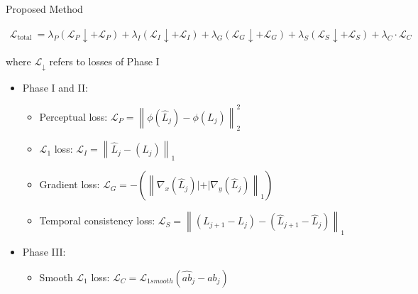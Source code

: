 \documentclass[aspectratio=43]{beamer}
\begin{document}
\begin{frame}{Proposed Method}
{\begin{footnotesize}
				\begin{equation*}
					\begin{gathered}
						\mathcal{L}_{\text {total }}=\lambda_{P}\left(\mathcal{L}_{P} \downarrow+\mathcal{L}_{P}\right)+\lambda_{I}\left(\mathcal{L}_{I} \downarrow+\mathcal{L}_{I}\right)+ 
						\lambda_{G}\left(\mathcal{L}_{G} \downarrow+\mathcal{L}_{G}\right)+\lambda_{S}\left(\mathcal{L}_{S} \downarrow+\mathcal{L}_{S}\right)+\lambda_{C} \cdot \mathcal{L}_{C}
					\end{gathered}
				\end{equation*}
			\end{footnotesize}
			where $ \mathcal{L}_{\downarrow} $ refers to losses of Phase I
			\begin{itemize}
				\item Phase I and II:
					\begin{itemize}
						\item Perceptual loss: $ \mathcal{L}_{P}=\left\|\phi\left(\hat{L}_{j}\right)-\phi\left(L_{j}\right)\right\|_{2}^{2} $
						\item $ \mathcal{L}_{1} $ loss: $ \mathcal{L}_{I}=\left\|\hat{L}_{j}-\left(L_{j}\right)\right\|_{1} $
						\item Gradient loss: $ \mathcal{L}_{G}=-\left(\left\|\nabla_{x}\left(\hat{L}_{j}\right)|+| \nabla_{y}\left(\hat{L}_{j}\right)\right\|_{1}\right) $
						\item Temporal consistency loss: $ \mathcal{L}_{S}=\left\|\left(L_{j+1}-L_{j}\right)-\left(\hat{L}_{j+1}-\hat{L}_{j}\right)\right\|_{1} $
					\end{itemize}
				\item Phase III:
					\begin{itemize}
						\item Smooth $ \mathcal{L}_{1} $ loss: $ \mathcal{L}_{C}=\mathcal{L}_{1smooth}\left(\hat{a b}_{j}-a b_{j}\right) $
					\end{itemize}
			\end{itemize}
		}
	\end{frame}
\end{document}
